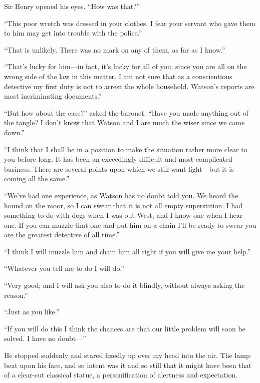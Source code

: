 \documentclass[paper=5.5in:8.5in,BCOR=7mm,twoside,DIV=calc,12pt,usegeometry,openany,chapterprefix,endperiod]{scrbook} %
\begin{document}
Sir Henry opened his eyes. \enquote{How was that?}

\enquote{This poor wretch was dressed in your clothes. I fear your servant who gave them to him may get into trouble with the police.}

\enquote{That is unlikely. There was no mark on any of them, as far as I know.}

\enquote{That's lucky for him\nobreakdash---in fact, it's lucky for all of you, since you are all on the wrong side of the law in this matter. I am not sure that as a conscientious detective my first duty is not to arrest the whole household. Watson's reports are most incriminating documents.}

\enquote{But how about the case?} asked the baronet. \enquote{Have you made anything out of the tangle? I don't know that Watson and I are much the wiser since we came down.}

\enquote{I think that I shall be in a position to make the situation rather more clear to you before long. It has been an exceedingly difficult and most complicated business. There are several points upon which we still want light\nobreakdash---but it is coming all the same.}

\enquote{We've had one experience, as Watson has no doubt told you. We heard the hound on the moor, so I can swear that it is not all empty superstition. I had something to do with dogs when I was out West, and I know one when I hear one. If you can muzzle that one and put him on a chain I'll be ready to swear you are the greatest detective of all time.}

\enquote{I think I will muzzle him and chain him all right if you will give me your help.}

\enquote{Whatever you tell me to do I will do.}

\enquote{Very good; and I will ask you also to do it blindly, without always asking the reason.}

\enquote{Just as you like.}

\enquote{If you will do this I think the chances are that our little problem will soon be solved. I have no doubt\nobreakdash---}

He stopped suddenly and stared fixedly up over my head into the air. The lamp beat upon his face, and so intent was it and so still that it might have been that of a clear-cut classical statue, a personification of alertness and expectation.
\end{document}
